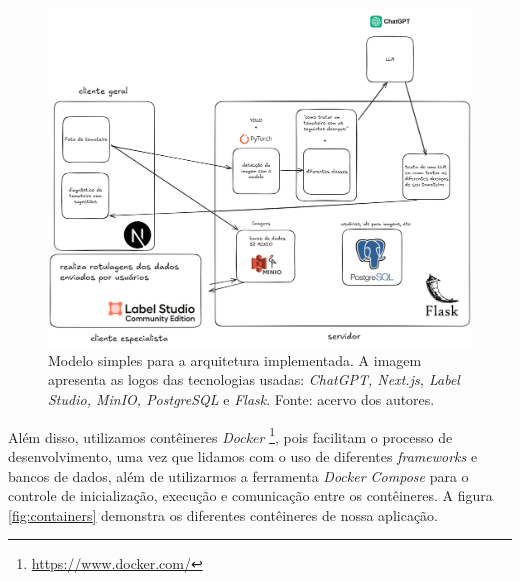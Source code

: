\begin{figure}[htbp]
    \centering
    \includegraphics[width=1\linewidth]{images/modelo.png}
    \caption{\label{fig:modelo_arq} Modelo simples para a arquitetura implementada. A imagem apresenta as logos das tecnologias usadas: \emph{ChatGPT, Next.js, Label Studio, MinIO, PostgreSQL} e \emph{Flask}. Fonte: acervo dos autores.}
\end{figure}

Além disso, utilizamos contêineres \emph{Docker} \footnote{\url{https://www.docker.com/}}, pois facilitam o processo de desenvolvimento, uma vez que lidamos com o uso de diferentes \textit{frameworks} e bancos de dados, além de utilizarmos a ferramenta \emph{Docker Compose} para o controle de inicialização, execução e comunicação entre os contêineres. A figura \ref{fig:containers} demonstra os diferentes contêineres de nossa aplicação.

